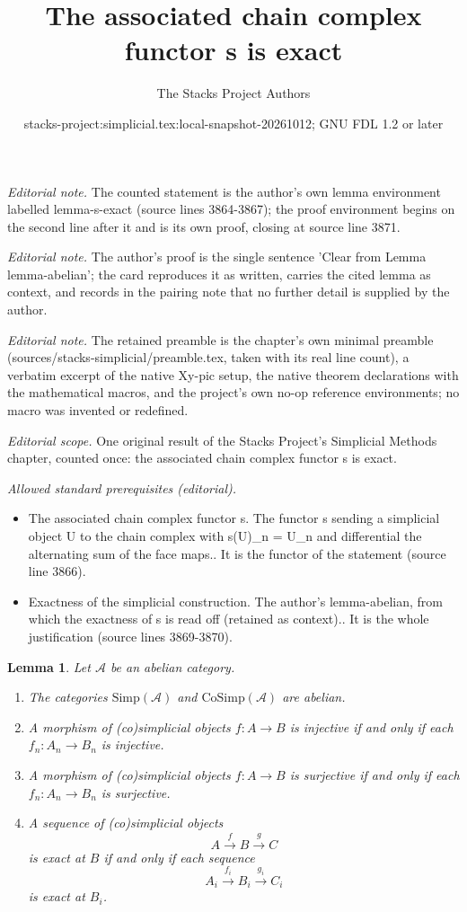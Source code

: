 \documentclass{stacks-project}
\title{The associated chain complex functor s is exact}
\author{The Stacks Project Authors}
\date{stacks-project:simplicial.tex:local-snapshot-20261012; GNU FDL 1.2 or later}
\theoremstyle{plain}
\newtheorem{lemma}[subsection]{Lemma}
\theoremstyle{definition}
\theoremstyle{remark}
\numberwithin{equation}{subsection}
\begin{document}
\maketitle
\noindent\textit{Editorial note.} The counted statement is the author's own lemma environment labelled lemma-s-exact (source lines 3864-3867); the proof environment begins on the second line after it and is its own proof, closing at source line 3871.\par\medskip
\noindent\textit{Editorial note.} The author's proof is the single sentence 'Clear from Lemma lemma-abelian'; the card reproduces it as written, carries the cited lemma as context, and records in the pairing note that no further detail is supplied by the author.\par\medskip
\noindent\textit{Editorial note.} The retained preamble is the chapter's own minimal preamble (sources/stacks-simplicial/preamble.tex, taken with its real line count), a verbatim excerpt of the native Xy-pic setup, the native theorem declarations with the mathematical macros, and the project's own no-op reference environments; no macro was invented or redefined.\par\medskip
\noindent\textit{Editorial scope.} One original result of the Stacks Project's Simplicial Methods chapter, counted once: the associated chain complex functor s is exact.\par\medskip
\noindent\textit{Allowed standard prerequisites (editorial).}\begin{itemize}
\item The associated chain complex functor s. The functor s sending a simplicial object U to the chain complex with s(U)\_n = U\_n and differential the alternating sum of the face maps.. It is the functor of the statement (source line 3866).
\item Exactness of the simplicial construction. The author's lemma-abelian, from which the exactness of s is read off (retained as context).. It is the whole justification (source lines 3869-3870).
\end{itemize}\medskip
\begin{lemma}
\label{lemma-abelian}
Let $\mathcal{A}$ be an abelian category.
\begin{enumerate}
\item The categories $\text{Simp}(\mathcal{A})$ and
$\text{CoSimp}(\mathcal{A})$ are abelian.
\item A morphism of (co)simplicial objects
$f : A \to B$ is injective
if and only if each $f_n : A_n \to B_n$ is injective.
\item A morphism of (co)simplicial objects
$f : A \to B$ is surjective
if and only if each $f_n : A_n \to B_n$ is surjective.
\item A sequence of (co)simplicial objects
$$
A \xrightarrow{f} B \xrightarrow{g} C
$$
is exact at $B$ if and only if each sequence
$$
A_i \xrightarrow{f_i} B_i \xrightarrow{g_i} C_i
$$
is exact at $B_i$.
\end{enumerate}
\end{lemma}
\end{document}
